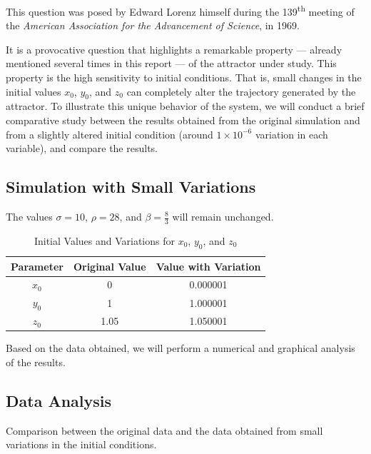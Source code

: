 \documentclass[12pt, a4paper]{article}
\begin{document}
	This question was posed by Edward Lorenz himself during the 139\textsuperscript{th} meeting of the \textit{American Association for the Advancement of Science}, in 1969.
	
	It is a provocative question that highlights a remarkable property — already mentioned several times in this report — of the attractor under study. This property is the high sensitivity to initial conditions. That is, small changes in the initial values $x_0$, $y_0$, and $z_0$ can completely alter the trajectory generated by the attractor. To illustrate this unique behavior of the system, we will conduct a brief comparative study between the results obtained from the original simulation and from a slightly altered initial condition (around $1 \times 10^{-6}$ variation in each variable), and compare the results.
	
	\subsection{Simulation with Small Variations}
	
	The values $\sigma=10$, $\rho = 28$, and $\beta = \frac{8}{3}$ will remain unchanged.
	
	\begin{table}[htbp]
		\centering
		\caption{Initial Values and Variations for \(x_0\), \(y_0\), and \(z_0\)}
		\begin{tabular}{|c|c|c|}
			\hline
			Parameter & Original Value & Value with Variation \\
			\hline
			$x_0$     & 0              & 0.000001             \\ \hline
			$y_0$     & 1              & 1.000001             \\ \hline
			$z_0$     & 1.05           & 1.050001             \\ \hline
		\end{tabular}
	\end{table}
	
	Based on the data obtained, we will perform a numerical and graphical analysis of the results.
	
	\subsection{Data Analysis}
	
	Comparison between the original data and the data obtained from small variations in the initial conditions.
	
\end{document}
